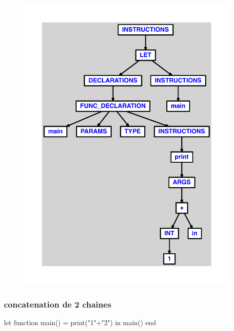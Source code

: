 \documentclass{article}
\begin{document}
\begin{figure}[H]\centering\includegraphics[max width=\textwidth]{ast/ast_141.pdf}\end{figure}\subsubsection{concatenation de 2 chaines}
\begin{verbatimtab}
let
	function main() = print("1"+"2")
in main() end
\end{verbatimtab}
\end{document}
